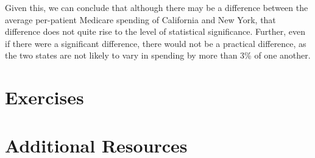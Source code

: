 Given this, we can conclude that although there may be a difference between the average per-patient Medicare spending of California and New York, that difference does not quite rise to the level of statistical significance. Further, even if there were a significant difference, there would not be a practical difference, as the two states are not likely to vary in spending by more than 3\% of one another.

\section{Exercises}

\section{Additional Resources}

